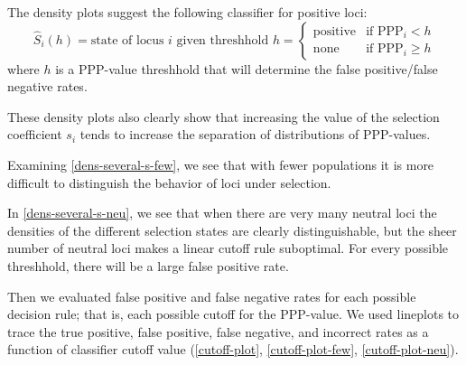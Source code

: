 \documentclass[a4paper,12pt]{article}
\begin{document}
The density plots suggest the following classifier for positive loci:
$$\hat{S}_{i}(h)=\text{state of locus $i$ given threshhold $h$} = 
\begin{cases}
  \text{positive} & \text{if PPP}_i<h\\
  \text{none}     & \text{if PPP}_i\geq h
\end{cases}
$$
where $h$ is a PPP-value threshhold that will determine the false
positive/false negative rates.

These density plots also clearly show that increasing the value of the
selection coefficient $s_i$ tends to increase the separation of
distributions of PPP-values.

Examining \autoref{dens-several-s-few}, we see that with fewer
populations it is more difficult to distinguish the behavior of loci
under selection.

In \autoref{dens-several-s-neu}, we see that when there are very many
neutral loci the densities of the different selection states are
clearly distinguishable, but the sheer number of neutral loci makes a
linear cutoff rule suboptimal. For every possible threshhold, there
will be a large false positive rate.

Then we evaluated false positive and false negative rates for each
possible decision rule; that is, each possible cutoff for the
PPP-value. We used lineplots to trace the true positive, false
positive, false negative, and incorrect rates as a function of
classifier cutoff value (\autoref{cutoff-plot},
\autoref{cutoff-plot-few}, \autoref{cutoff-plot-neu}).



\end{document}
